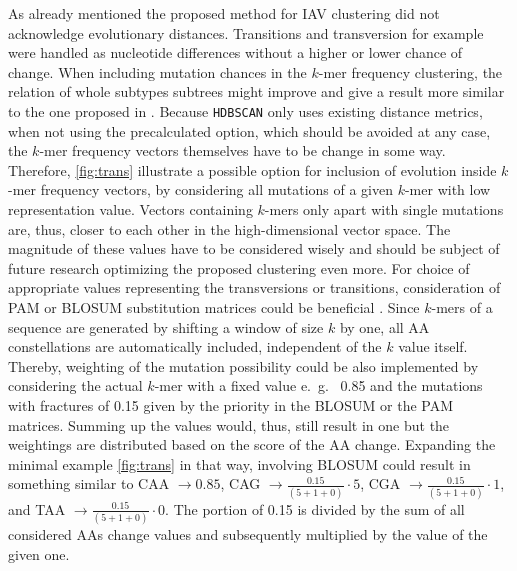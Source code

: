 As already mentioned the proposed method for \gls{IAV} clustering did not acknowledge evolutionary distances. Transitions and transversion for example were handled as nucleotide differences without a higher or lower chance of change. When including mutation chances in the $k$-mer frequency clustering, the relation of whole subtypes subtrees might improve and give a result more similar to the one proposed in \textcite{wei_next-generation_2020}. Because \texttt{HDBSCAN} only uses existing distance metrics, when not using the precalculated option, which should be avoided at any case, the $k$-mer frequency vectors themselves have to be change in some way. Therefore, \autoref{fig:trans} illustrate a possible option for inclusion of evolution inside $k$-mer frequency vectors, by considering all mutations of a given $k$-mer with low representation value. Vectors containing $k$-mers only apart with single mutations are, thus, closer to each other in the high-dimensional vector space. The magnitude of these values have to be considered wisely and should be subject of future research optimizing the proposed clustering even more. For choice of appropriate values representing the transversions or transitions, consideration of PAM or BLOSUM substitution matrices could be beneficial \autocite{mount_comparison_2008}. Since $k$-mers of a sequence are generated by shifting a window of size $k$ by one, all \gls{AA} constellations are automatically included, independent of the $k$ value itself. Thereby, weighting of the mutation possibility could be also implemented by considering the actual $k$-mer with a fixed value e.~g.~ 0.85 and the mutations with fractures of 0.15 given by the priority in the BLOSUM or the PAM matrices. Summing up the values would, thus, still result in one but the weightings are distributed based on the score of the \gls{AA} change. Expanding the minimal example \autoref{fig:trans} in that way, involving BLOSUM could result in something similar to CAA $\rightarrow 0.85$, CAG $\rightarrow \frac{0.15}{(5+1+0)}\cdot 5$, CGA $\rightarrow \frac{0.15}{(5+1+0)}\cdot 1$, and TAA $\rightarrow \frac{0.15}{(5+1+0)}\cdot 0$. The portion of 0.15 is divided by the sum of all considered \glspl{AA} change values and subsequently multiplied by the value of the given one.

\vspace{1em}

